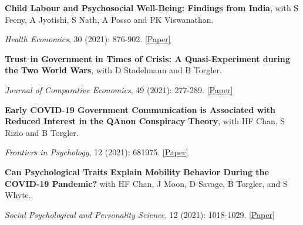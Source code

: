 \documentclass[letterpaper]{article}
\renewenvironment{itemize}{
  \begin{list}{}{
    \setlength{\leftmargin}{1.5em}
  }
}{
  \end{list}
}
\begin{document}
\begin{itemize}
	
			\item \textbf{Child Labour and Psychosocial Well-Being: Findings from India}, with S Feeny, A Jyotishi, S Nath, A Posso and PK Viswanathan. 

	\vspace{-0.05in}
	
		\item \textit{Health Economics}, 30 (2021): 876-902. \href{https://drive.google.com/file/d/1I9yWtV-pGuyV0i0fq94jGkzt6pMkHtGl/view?usp=sharing}{[Paper]}

	\medskip
	
			\item {\bf Trust in Government in Times of Crisis:
		A Quasi-Experiment during the Two World Wars}, with  D Stadelmann and B Torgler. 
	
	\vspace{-0.05in}

		\item \textit{Journal of Comparative Economics}, 49 (2021): 277-289.  \href{http://www.crema-research.ch/papers/2019-04.pdf}{[Paper]}

\medskip 

	\item \textbf{Early COVID-19 Government Communication is Associated with Reduced Interest in the QAnon Conspiracy Theory}, with HF Chan, S Rizio and B Torgler.
		\vspace{-0.05in}

		\item \textit{Frontiers in Psychology}, 12 (2021): 681975. \href{https://www.frontiersin.org/articles/10.3389/fpsyg.2021.681975/full}{[Paper]}


\medskip
	
		\item \textbf{Can Psychological Traits Explain Mobility Behavior During the COVID-19 Pandemic?} with HF Chan, J Moon, D Savage, B Torgler, and S Whyte. 
	\vspace{-0.05in}
		\item \textit{Social Psychological and Personality Science}, 12 (2021): 1018-1029.  \href{https://psyarxiv.com/5q3jv/}{[Paper]}

	\medskip


\end{itemize}
\end{document}
